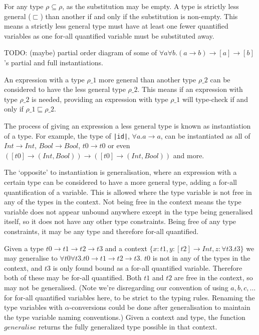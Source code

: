 \documentclass[a4paper,fleqn,twoside,12pt]{report}
\begin{document}
For any type $\rho \subseteq \rho$, as the substitution may be empty. A type is strictly less general ($\sqsubset$) than another if and only if the substitution is non-empty. This means a strictly less general type must have at least one fewer quantified variables as one for-all quantified variable must be substituted away.

TODO: (maybe) partial order diagram of some of $\forall a \forall b. (a \rightarrow b) \rightarrow [a] \rightarrow [b]$’s partial and full instantiations.

An expression with a type $\rho\_1$ more general than another type $\rho\_2$ can be considered to have the less general type $\rho\_2$. This means if an expression with type $\rho\_2$ is needed, providing an expression with type $\rho\_1$ will type-check if and only if $\rho\_1 \sqsubseteq \rho\_2$.

The process of giving an expression a less general type is known as instantiation of a type. For example, the type of \texttt{|id|}, $\forall a. a \rightarrow a$, can be instantiated as all of $Int \rightarrow Int$, $Bool \rightarrow Bool$, $t0 \rightarrow t0$ or even $([t0] \rightarrow (Int, Bool)) \rightarrow ([t0] \rightarrow (Int, Bool))$ and more.

The ‘opposite’ to instantiation is generalisation, where an expression with a certain type can be considered to have a more general type, adding a for-all quantification of a variable. This is allowed where the type variable is not free in any of the types in the context. Not being free in the context means the type variable does not appear unbound anywhere except in the type being generalised itself, so it does not have any other type constraints. Being free of any type constraints, it may be any type and therefore for-all quantified.

Given a type $t0 \rightarrow t1 \rightarrow t2 \rightarrow t3$ and a context $\{ x : t1, y : [t2] \rightarrow Int, z: \forall t3. t3 \}$ we may generalise to $\forall t0 \forall t3. t0 \rightarrow t1 \rightarrow t2 \rightarrow t3$. $t0$ is not in any of the types in the context, and $t3$ is only found bound as a for-all quantified variable. Therefore both of these may be for-all quantified. Both $t1$ and $t2$ are free in the context, so may not be generalised. (Note we’re disregarding our convention of using $a, b, c, \dots$ for for-all quantified variables here, to be strict to the typing rules. Renaming the type variables with $\alpha$-conversions could be done after generalisation to maintain the type variable naming conventions.) Given a context and type, the function $generalise$ returns the fully generalized type possible in that context.
\end{document}
